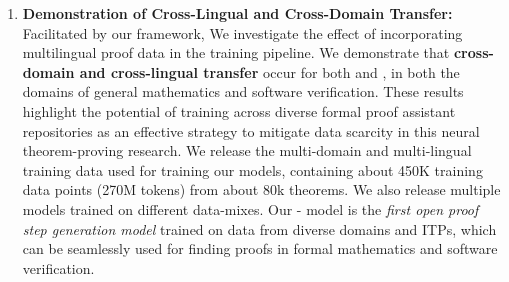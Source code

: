 \begin{enumerate}
\item \textbf{Demonstration of Cross-Lingual and Cross-Domain Transfer:} Facilitated by our \name framework, We investigate the effect of incorporating multilingual proof data in the training pipeline. We demonstrate that \textbf{cross-domain and cross-lingual transfer} occur for both \lean\; and \coq, in both the domains of general mathematics and software verification. These results highlight the potential of training across diverse formal proof assistant repositories as an effective strategy to mitigate data scarcity in this neural theorem-proving research. We release the multi-domain and multi-lingual training data used for training our models, containing about 450K training data points (270M tokens) from about 80k theorems. We also release multiple \name models trained on different data-mixes. Our \proofwala-\multi\; model is the \emph{first open proof step generation model} trained on data from diverse domains and ITPs, which can be seamlessly used for finding proofs in formal mathematics and software verification. 
\end{enumerate}
